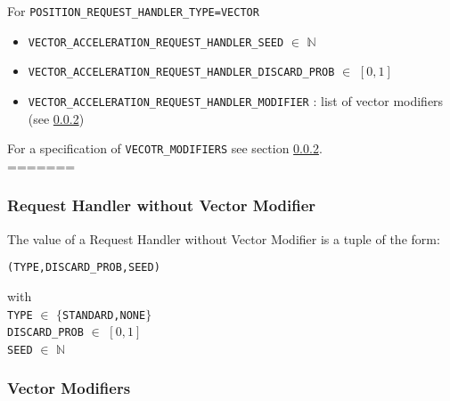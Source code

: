 For \texttt{POSITION\_REQUEST\_HANDLER\_TYPE=VECTOR} \\
\begin{itemize}
\item \texttt{VECTOR\_ACCELERATION\_REQUEST\_HANDLER\_SEED} $\in$ $\mathbb{N}$
\item \texttt{VECTOR\_ACCELERATION\_REQUEST\_HANDLER\_DISCARD\_PROB} $\in$ $[0,1]$
\item \texttt{VECTOR\_ACCELERATION\_REQUEST\_HANDLER\_MODIFIER} : list of vector modifiers (see \ref{sec:vectorModifiers})
\end{itemize} 

For a specification of \texttt{VECOTR\_MODIFIERS} see section \ref{sec:vectorModifiers}.\\
=======
\subsubsection{Request Handler without Vector Modifier}\label{sec:requestHandlerWithoutVectorModifier}
The value of a Request Handler without Vector Modifier is a tuple of the form:
\begin{center}
\texttt{(TYPE,DISCARD\_PROB,SEED)}\\
\end{center}
with\\
\texttt{TYPE} $\in$ $\{$\texttt{STANDARD,NONE}$\}$\\
\texttt{DISCARD\_PROB} $\in$ $[0,1]$\\
\texttt{SEED} $\in$ $\mathbb{N}$

\subsubsection{Vector Modifiers}\label{sec:vectorModifiers}

